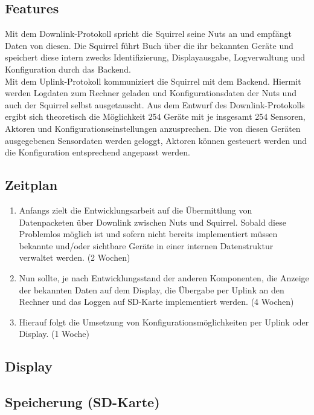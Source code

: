 \documentclass[12pt,a4paper]{article}
\begin{document}
\subsection{Features}
Mit dem Downlink-Protokoll spricht die Squirrel seine Nuts an und empfängt Daten von diesen. Die Squirrel führt Buch über die ihr bekannten Geräte und speichert diese intern zwecks Identifizierung, Displayausgabe, Logverwaltung und Konfiguration durch das Backend.\\
Mit dem Uplink-Protokoll kommuniziert die Squirrel mit dem Backend. Hiermit werden Logdaten zum Rechner geladen und Konfigurationsdaten der Nuts und auch der Squirrel selbst ausgetauscht.
Aus dem Entwurf des Downlink-Protokolls ergibt sich theoretisch die Möglichkeit 254 Geräte mit je insgesamt 254 Sensoren, Aktoren und Konfigurationseinstellungen anzusprechen. Die von diesen Geräten ausgegebenen Sensordaten werden geloggt, Aktoren können gesteuert werden und die Konfiguration entsprechend angepasst werden.

\subsection{Zeitplan}
\begin{enumerate}
	\item Anfangs zielt die Entwicklungsarbeit auf die Übermittlung von Datenpacketen über Downlink zwischen Nuts und Squirrel. Sobald diese Problemlos möglich ist und sofern nicht bereits implementiert müssen bekannte und/oder sichtbare Geräte in einer internen Datenstruktur verwaltet werden. (2 Wochen)
	\item Nun sollte, je nach Entwicklungsstand der anderen Komponenten, die Anzeige der bekannten Daten auf dem Display, die Übergabe per Uplink an den Rechner und das Loggen auf SD-Karte implementiert werden. (4 Wochen)
	\item Hierauf folgt die Umsetzung von Konfigurationsmöglichkeiten per Uplink oder Display. (1 Woche)
\end{enumerate}

\subsection{Display}



\subsection{Speicherung (SD-Karte)}
\end{document}
